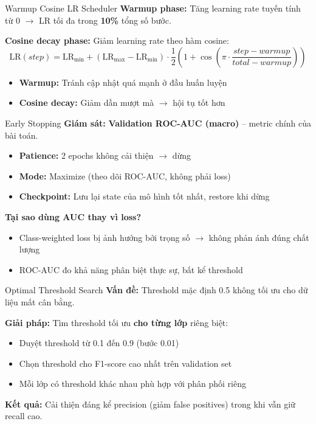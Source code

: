 \documentclass[serif, aspectratio=169]{beamer}
\begin{document}
\begin{frame}{Warmup Cosine LR Scheduler}
\textbf{Warmup phase:} Tăng learning rate tuyến tính từ 0 $\rightarrow$ LR tối đa trong \textbf{10\%} tổng số bước.

\vspace{0.3cm}
\textbf{Cosine decay phase:} Giảm learning rate theo hàm cosine:
\[
\text{LR}(step) = \text{LR}_{\min} + (\text{LR}_{\max} - \text{LR}_{\min}) \cdot \frac{1}{2}\left(1 + \cos\left(\pi \cdot \frac{step - warmup}{total - warmup}\right)\right)
\]
\vspace{0.2cm}
\begin{itemize}
    \item \textbf{Warmup:} Tránh cập nhật quá mạnh ở đầu huấn luyện
    \item \textbf{Cosine decay:} Giảm dần mượt mà $\rightarrow$ hội tụ tốt hơn
\end{itemize}
\end{frame}

\begin{frame}{Early Stopping}
\textbf{Giám sát:} \textbf{Validation ROC-AUC (macro)} -- metric chính của bài toán.

\vspace{0.3cm}
\begin{itemize}
    \item \textbf{Patience:} 2 epochs không cải thiện $\rightarrow$ dừng
    \item \textbf{Mode:} Maximize (theo dõi ROC-AUC, không phải loss)
    \item \textbf{Checkpoint:} Lưu lại state của mô hình tốt nhất, restore khi dừng
\end{itemize}
\vspace{0.2cm}
\textbf{Tại sao dùng AUC thay vì loss?}
\begin{itemize}
    \item Class-weighted loss bị ảnh hưởng bởi trọng số $\rightarrow$ không phản ánh đúng chất lượng
    \item ROC-AUC đo khả năng phân biệt thực sự, bất kể threshold
\end{itemize}
\end{frame}

\begin{frame}{Optimal Threshold Search}
\textbf{Vấn đề:} Threshold mặc định 0.5 không tối ưu cho dữ liệu mất cân bằng.

\vspace{0.3cm}
\textbf{Giải pháp:} Tìm threshold tối ưu \textbf{cho từng lớp} riêng biệt:
\begin{itemize}
    \item Duyệt threshold từ 0.1 đến 0.9 (bước 0.01)
    \item Chọn threshold cho F1-score cao nhất trên validation set
    \item Mỗi lớp có threshold khác nhau phù hợp với phân phối riêng
\end{itemize}
\vspace{0.2cm}
\textbf{Kết quả:} Cải thiện đáng kể precision (giảm false positives) trong khi vẫn giữ recall cao.
\end{frame}
\end{document}
